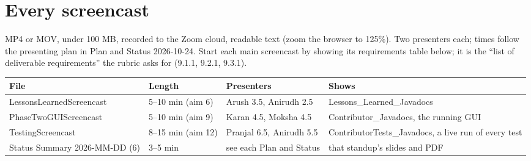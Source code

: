 \documentclass[10pt]{article}
\begin{document}

\section*{Every screencast}
MP4 or MOV, under 100 MB, recorded to the Zoom cloud, readable text (zoom the browser to 125\%).
Two presenters each; times follow the presenting plan in Plan and Status 2026-10-24. Start each
main screencast by showing its requirements table below; it is the ``list of deliverable
requirements'' the rubric asks for (9.1.1, 9.2.1, 9.3.1).

\begin{tabularx}{\linewidth}{@{}l l l X@{}}
\toprule
\textbf{File} & \textbf{Length} & \textbf{Presenters} & \textbf{Shows} \\
\midrule
LessonsLearnedScreencast & 5--10 min (aim 6) & Arush 3.5, Anirudh 2.5 & Lessons\_Learned\_Javadocs \\
PhaseTwoGUIScreencast & 5--10 min (aim 9) & Karan 4.5, Moksha 4.5 & Contributor\_Javadocs, the running GUI \\
TestingScreencast & 8--15 min (aim 12) & Pranjal 6.5, Anirudh 5.5 & ContributorTests\_Javadocs, a live run of every test \\
Status Summary 2026-MM-DD (6) & 3--5 min & see each Plan and Status & that standup's slides and PDF \\
\bottomrule
\end{tabularx}
\end{document}

